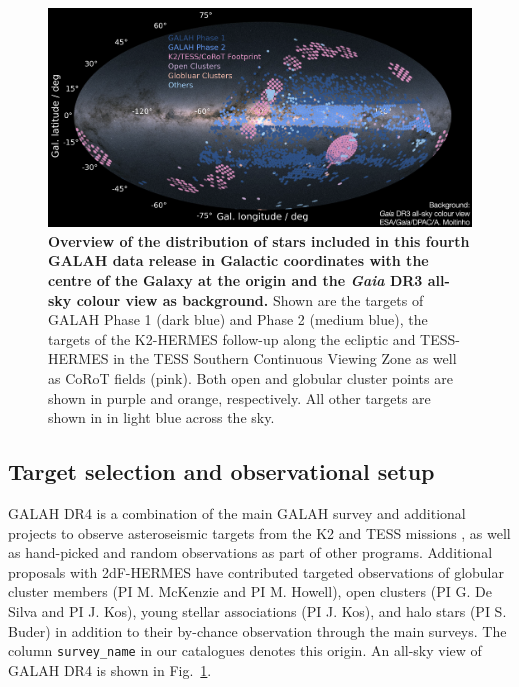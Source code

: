 \documentclass[
  journal=pasa,
  manuscript=research-paper, %
  year=2024,
  volume=37
]{cup-journal}
\newcommand{\Gaia}{\textit{Gaia}\xspace}
\begin{document}
\begin{figure}[ht]
 \centering
 \includegraphics[width=\textwidth]{figures/galah_dr4_skymap_gaiadr3.png}
 \caption{\textbf{Overview of the distribution of stars included in this fourth GALAH data release in Galactic coordinates with the centre of the Galaxy at the origin and the \Gaia DR3 all-sky colour view \citep{GaiaDR3} as background.}
Shown are the targets of GALAH Phase 1 (dark blue) and Phase 2 (medium blue), the targets of the K2-HERMES follow-up along the ecliptic and TESS-HERMES in the TESS Southern Continuous Viewing Zone as well as CoRoT fields (pink). Both open and globular cluster points are shown in purple and orange, respectively. All other targets are shown in in light blue across the sky.
}
 \label{fig:galah_dr4_skymap_gaiadr3}
\end{figure}

\subsection{Target selection and observational setup} \label{sec:target_selection_observations}

GALAH DR4 is a combination of the main GALAH survey and additional projects to observe asteroseismic targets from the K2 \citep{Sharma2019} and TESS missions \citep{Sharma2018}, as well as hand-picked and random observations as part of other programs. Additional proposals with 2dF-HERMES have contributed targeted observations of globular cluster members (PI M. McKenzie and PI M. Howell), open clusters (PI G. De Silva and PI J. Kos), young stellar associations (PI J. Kos), and halo stars (PI S. Buder) in addition to their by-chance observation through the main surveys. The column \texttt{survey\_name} in our catalogues denotes this origin. An all-sky view of GALAH DR4 is shown in Fig.~\ref{fig:galah_dr4_skymap_gaiadr3}.
\end{document}

